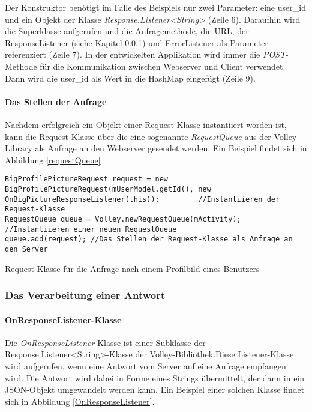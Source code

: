 \documentclass[../main.tex]{subfiles}
\begin{document}
	Der Konstruktor benötigt im Falle des Beispiels nur zwei Parameter: eine user\_id und ein Objekt der Klasse \emph{Response.Listener<String>} (Zeile 6). Daraufhin wird die Superklasse aufgerufen und die Anfragemethode, die URL, der ResponseListener (siehe Kapitel \ref{responseListener}) und ErrorListener als Parameter referenziert (Zeile 7). In der entwickelten Applikation wird immer die \emph{POST}-Methode für die Kommunikation zwischen Webserver und Client verwendet. Dann wird die user\_id als Wert in die HashMap eingefügt (Zeile 9).
	
	\paragraph{Das Stellen der Anfrage}
	Nachdem erfolgreich ein Objekt einer Request-Klasse instantiiert worden ist, kann die Request-Klasse über die eine sogenannte \emph{RequestQueue} aus der Volley Library als Anfrage an den Webserver gesendet werden. Ein Beispiel findet sich in Abbildung \ref{requestQueue}
	
\begin{code}
	\begin{center}
		\begin{verbatim}
BigProfilePictureRequest request = new BigProfilePictureRequest(mUserModel.getId(), new OnBigPictureResponseListener(this)); 		 //Instantiieren der Request-Klasse
RequestQueue queue = Volley.newRequestQueue(mActivity); //Instantiieren einer neuen RequestQueue
queue.add(request); //Das Stellen der Request-Klasse als Anfrage an den Server
		\end{verbatim}
		\caption{Request-Klasse für die Anfrage nach einem Profilbild eines Benutzers}
		\label{requestQueue}
	\end{center}
\end{code}	
	
	\subsubsection{Das Verarbeitung einer Antwort} \label{responseListener}
	\paragraph{OnResponseListener-Klasse} Die \emph{OnResponseListener}-Klasse ist einer Subklasse der Response.Listener<String>-Klasse der Volley-Bibliothek.Diese Listener-Klasse wird aufgerufen, wenn eine Antwort vom Server auf eine Anfrage empfangen wird. Die Antwort wird dabei in Forme eines Strings übermittelt, der dann in ein JSON-Objekt umgewandelt werden kann. Ein Beispiel einer solchen Klasse findet sich in Abbildung \ref{OnResponseListener}.
	
\end{document}

